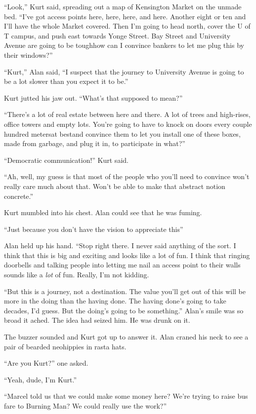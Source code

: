 ``Look,'' Kurt said, spreading out a map of Kensington Market on the
unmade bed.  ``I've got access points here, here, here, and here. 
Another eight or ten and I'll have the whole Market covered.  Then I'm
going to head north, cover the U of T campus, and push east towards
Yonge Street.  Bay Street and University Avenue are going to be
tough\dash{}how can I convince bankers to let me plug this by their
windows?''

``Kurt,'' Alan said, ``I suspect that the journey to University Avenue
is going to be a lot slower than you expect it to be.''

Kurt jutted his jaw out.  ``What's that supposed to mean?''

``There's a lot of real estate between here and there.  A lot of trees
and high-rises, office towers and empty lots.  You're going to have to
knock on doors every couple hundred meters\dash{}at best\dash{}and convince
them to let you install one of these boxes, made from garbage, and
plug it in, to participate in what?''

``Democratic communication!'' Kurt said.

``Ah, well, my guess is that most of the people who you'll need to
convince won't really care much about that.  Won't be able to make
that abstract notion concrete.''

Kurt mumbled into his chest.  Alan could see that he was fuming.

``Just because you don't have the vision to appreciate this\dash{}''

Alan held up his hand.  ``Stop right there.  I never said anything of
the sort.  I think that this is big and exciting and looks like a lot
of fun.  I think that ringing doorbells and talking people into
letting me nail an access point to their walls sounds like a
\textit{lot} of fun.  Really, I'm not kidding.

``But this is a journey, not a destination.  The value you'll get out
of this will be more in the doing than the having done.  The having
done's going to take decades, I'd guess.  But the doing's going to be
something.'' Alan's smile was so broad it ached.  The idea had seized
him.  He was drunk on it.

The buzzer sounded and Kurt got up to answer it.  Alan craned his neck
to see a pair of bearded neohippies in rasta hats. 

``Are you Kurt?'' one asked.

``Yeah, dude, I'm Kurt.''

``Marcel told us that we could make some money here?  We're trying to
raise bus fare to Burning Man?  We could really use the work?''

